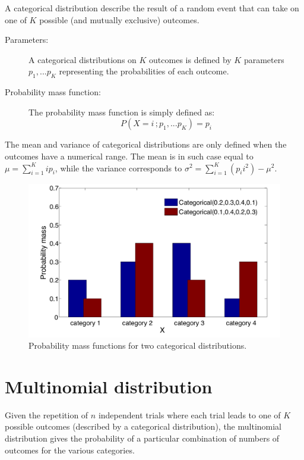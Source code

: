 A categorical distribution describe the result of a random event that can take on one of $K$ possible (and mutually exclusive) outcomes.

\begin{description}
\item [Parameters: ] A categorical distributions on $K$ outcomes is defined by $K$ parameters $p_1,...p_K$ representing the probabilities of each outcome.

\item [Probability mass function: ] The probability mass function is simply defined as:
\begin{equation}
P(X=i\,; p_1,... p_K) = p_i
\end{equation} 
\end{description}

The mean and variance of categorical distributions are only defined when the outcomes have a numerical range.  The mean is in such case equal to $\mu = \sum_{i=1}^{K} i p_i$, while the variance corresponds to $\sigma^2 = \sum_{i=1}^K (p_i i^2) - \mu^2$.

\begin{figure}[h]
\centering
\includegraphics[scale=0.40]{imgs/categorical_appendix.pdf}
\caption{Probability mass functions for two categorical distributions.} 
\label{fig:categorical-appendix}
\end{figure}

\section*{Multinomial distribution}

Given the repetition of $n$ independent trials where each trial leads to one of $K$ possible outcomes (described by a categorical distribution), the multinomial distribution gives the probability of a particular combination of numbers of outcomes for the various categories. 

